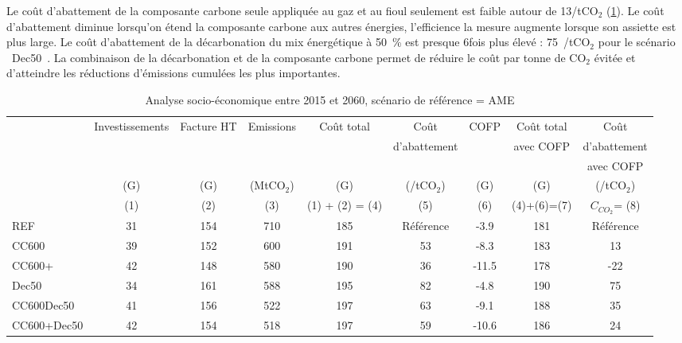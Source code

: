 \documentclass[10.5pt,a4paper]{article}
\def\euro{\mbox{\raisebox{.25ex}{{\it =}}\hspace{-.5em}{\sf C}}}
\begin{document}
{Le coût d'abattement de la composante carbone seule appliquée au gaz et au fioul seulement est faible autour de 13\euro/tCO$_2$ (\ref{Bilan_socio__CC}). Le coût d'abattement diminue lorsqu'on étend la composante carbone aux autres énergies, l'efficience la mesure augmente lorsque son assiette est plus large. Le coût d'abattement de la décarbonation du mix énergétique à 50~\% est presque 6fois plus élevé : 75~\euro/tCO$_2$ pour le scénario  \og~Dec50~\fg. La combinaison de la décarbonation et de la composante carbone permet de réduire le coût par tonne de CO$_2$ évitée et d'atteindre les réductions d'émissions cumulées les plus importantes. 
	
\begin{table}[h] \caption{Analyse socio-économique entre 2015 et 2060, scénario de référence  = AME}\label{Bilan_socio__CC} 
\begin{center}
\scriptsize
\begin{tabular}[c]{|l|c|c|c|c|c|c|c|c|}
\hline
			& Investissements	& Facture HT & Emissions	& Coût total  &	Coût 						& COFP	&Coût total	& Coût 					 \\
			&									&						 & 						&							&	d'abattement		&				&avec COFP	& d'abattement 	 \\	
			&									&						 &						&							&					&				&						&	avec COFP 				\\
			&		(G\euro)			&		(G\euro) &	(MtCO$_2$)&	(G\euro)		&	(\euro/tCO$_2$)	&	(G\euro) & (G\euro) & 	(\euro/tCO$_2$)	 \\
			&   (1) 					&    (2) 		 &   (3) 			&  (1) + (2) = (4)  &  		(5)			& 	(6)		&    (4)+(6)=(7)       &      $C_{CO_2}$= (8)          \\
\hline
REF 				&31 &154 &710 &185 &Référence &-3.9 	&181 &Référence \\
CC600 			&39 &152 &600 &191 &53 &-8.3 	&183 &13	\\
CC600+ 			&42 &148 &580 &190 &36 &-11.5 &178 &-22\\
Dec50 			&34 &161 &588 &195 &82 &-4.8 	&190 &75\\
CC600Dec50 	&41 &156 &522 &197 &63 &-9.1 	&188 &35\\
CC600+Dec50 &42 &154 &518 &197 &59 &-10.6 &186 &24\\
\hline
\end{tabular}
\end{center}

\end{table}}
\end{document}
